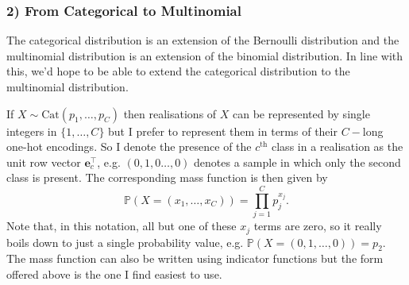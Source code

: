\documentclass[11pt]{article}
\begin{document}
\begin{appendices}
\subsubsection*{2) From Categorical to Multinomial}
The categorical distribution is an extension of the Bernoulli distribution and the multinomial distribution is an extension of the binomial distribution. In line with this, we'd hope to be able to extend the categorical distribution to the multinomial distribution.

If $X\sim\text{Cat}(p_1,\dots,p_C)$ then realisations of $X$ can be represented by single integers in $\{1,\dots,C\}$ but I prefer to represent them in terms of their $C-$long one-hot encodings. So I denote the presence of the $c^{\text{th}}$ class in a realisation as the unit row vector $\mathbf{e}_c^\top $, e.g. $(0,1,0\dots,0)$ denotes a sample in which only the second class is present. The corresponding mass function is then given by
$$
\mathbb{P}(X=(x_1,\dots,x_C))
=
\prod_{j=1}^Cp_j^{x_j}.
$$
Note that, in this notation, all but one of these $x_j$ terms are zero, so it really boils down to just a single probability value, e.g. $\mathbb{P}(X=(0,1,\dots,0))=p_2$. The mass function can also be written using indicator functions but the form offered above is the one I find easiest to use.


\end{appendices}
\end{document}
